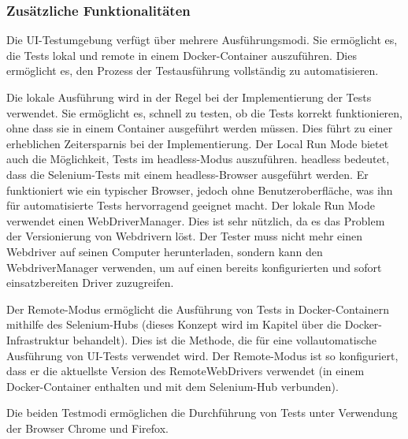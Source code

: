 \subsubsection{Zusätzliche Funktionalitäten}

Die UI-Testumgebung verfügt über mehrere Ausführungsmodi.
Sie ermöglicht es, die Tests lokal und remote in einem Docker-Container
auszuführen. Dies ermöglicht es, den Prozess der Testausführung 
vollständig zu automatisieren.


Die lokale Ausführung wird in der Regel bei der Implementierung
der Tests verwendet. Sie ermöglicht es, schnell zu testen, ob die
Tests korrekt funktionieren, ohne dass sie in einem Container
ausgeführt werden müssen. Dies führt zu einer erheblichen Zeitersparnis
bei der Implementierung. Der Local Run Mode bietet auch die
Möglichkeit, Tests im \Gls{headless}-Modus auszuführen. \Gls{headless} bedeutet,
dass die Selenium-Tests mit einem \Gls{headless}-Browser ausgeführt werden.
Er funktioniert wie ein typischer Browser, jedoch ohne
Benutzeroberfläche, was ihn für automatisierte Tests hervorragend geeignet macht.
Der lokale Run Mode verwendet einen WebDriverManager. Dies ist sehr
nützlich, da es das Problem der Versionierung von Webdrivern löst.
Der Tester muss nicht mehr einen Webdriver auf seinen Computer
herunterladen, sondern kann den WebdriverManager verwenden, um
auf einen bereits konfigurierten und sofort einsatzbereiten Driver
zuzugreifen.

Der Remote-Modus ermöglicht die Ausführung von Tests in
Docker-Containern mithilfe des Selenium-Hubs (dieses Konzept wird
im Kapitel über die Docker-Infrastruktur behandelt). Dies ist die
Methode, die für eine vollautomatische Ausführung von UI-Tests
verwendet wird. Der Remote-Modus ist so konfiguriert, dass er die
aktuellste Version des RemoteWebDrivers verwendet (in einem
Docker-Container enthalten und mit dem Selenium-Hub verbunden).



Die beiden Testmodi ermöglichen die Durchführung von Tests unter
Verwendung der Browser Chrome und Firefox.